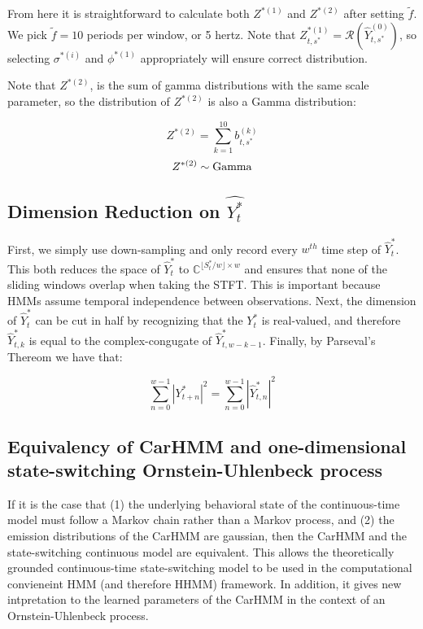 From here it is straightforward to calculate both $Z^{*(1)}$ and $Z^{*(2)}$ after setting $\tilde{f}$. We pick $\tilde{f} = 10$ periods per window, or 5 hertz. Note that $Z^{*(1)}_{t,s^*} = \mathcal{R}\left(\hat{Y}^{(0)}_{t,s^*}\right)$, so selecting $\sigma^{*(i)}$ and $\phi^{*(1)}$ appropriately will ensure correct distribution. 

Note that $Z^{*(2)}$, is the sum of gamma distributions with the same scale parameter, so the distribution of $Z^{*(2)}$ is also a Gamma distribution:

$$Z^{*(2)} = \sum_{k=1}^{10} b^{(k)}_{t,s^*}$$
$$Z^{*(2)} \sim {\rm{Gamma}}$$


























\iffalse


\subsection{Dimension Reduction on $\hat{Y_t^*}$}

First, we simply use down-sampling and only record every $w^{th}$ time step of $\hat{Y}_t^*$. This both reduces the space of $\hat{Y}_t^*$ to $\mathbb{C}^{\lfloor S^*_t / w \rfloor \times w}$ and ensures that none of the sliding windows overlap when taking the STFT. This is important because HMMs assume temporal independence between observations. Next, the dimension of $\hat{Y}_t^*$ can be cut in half by recognizing that the $Y_t^*$ is real-valued, and therefore $\hat{Y}_{t,k}^*$ is equal to the complex-congugate of $\hat{Y}_{t,w-k-1}^*$. Finally, by Parseval's Thereom we have that:

$$\sum_{n = 0}^{w-1} |Y^*_{t+n}|^2 = \sum_{n = 0}^{w-1} |\hat{Y}^*_{t,n}|^2$$

\subsection{Equivalency of CarHMM and one-dimensional state-switching Ornstein-Uhlenbeck process}

If it is the case that (1) the underlying behavioral state of the continuous-time model must follow a Markov chain rather than a Markov process, and (2) the emission distributions of the CarHMM are gaussian, then the CarHMM and the state-switching continuous model are equivalent. This allows the theoretically grounded continuous-time state-switching model to be used in the computational convieneint HMM (and therefore HHMM) framework. In addition, it gives new intpretation to the learned parameters of the CarHMM in the context of an Ornstein-Uhlenbeck process.

